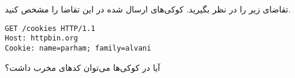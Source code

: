 \documentclass[../main.tex]{subfiles}
\begin{document}

تقاضای زیر را در نظر بگیرید. کوکی‌های ارسال شده در این تقاضا را مشخص کنید.

\begin{latin}
\begin{verbatim}
GET /cookies HTTP/1.1
Host: httpbin.org
Cookie: name=parham; family=alvani
\end{verbatim}
\end{latin}

آیا در کوکی‌ها می‌توان کدهای مخرب داشت؟
\end{document}
